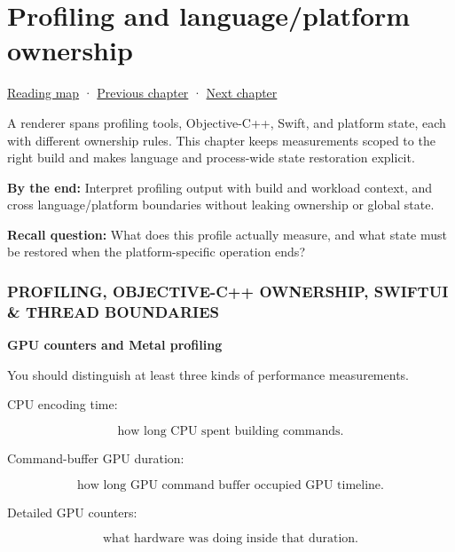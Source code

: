 \chapter{Profiling and language/platform ownership}\label{05-engine-i-ch024-profiling-and-languageplatform-ownership}\hypertarget{05-engine-i-ch024}{}\label{stagechapter:05-engine-i-ch024}

\hypertarget{05-engine-i-ch024-profiling-and-languageplatform-ownership}{}

\hyperref[volume-reading-map]{Reading map} · \hyperref[05-engine-i-ch023-execute-and-measure-a-metal-frame]{Previous chapter} · \hyperref[06-engine-ii-ch025-renderer-evolution-through-resource-ownership]{Next chapter}

A renderer spans profiling tools, Objective-C++, Swift, and platform state, each with different ownership rules. This chapter keeps measurements scoped to the right build and makes language and process-wide state restoration explicit.

\textbf{By the end:} Interpret profiling output with build and workload context, and cross language/platform boundaries without leaking ownership or global state.

\textbf{Recall question:} What does this profile actually measure, and what state must be restored when the platform-specific operation ends?

\subsection{PROFILING, OBJECTIVE-C++ OWNERSHIP, SWIFTUI \& THREAD BOUNDARIES}\label{05-engine-i-ch024-profiling-objective-c-ownership-swiftui-thread-boundaries}

\hypertarget{05-engine-i-ch024-profiling-objective-c-ownership-swiftui-thread-boundaries}{}

\textbf{GPU counters and Metal profiling}

You should distinguish at least three kinds of performance measurements.

CPU encoding time:

\[
\text{how long CPU spent building commands}.
\]

Command-buffer GPU duration:

\[
\text{how long GPU command buffer occupied GPU timeline}.
\]

Detailed GPU counters:

\[
\text{what hardware was doing inside that duration}.
\]

